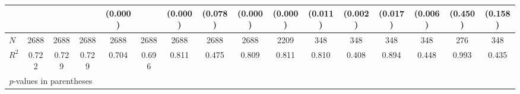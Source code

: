 \begin{tabular}{l*{15}{c}}
            &            &            &            &     (0.000)&            &     (0.000)&     (0.078)&     (0.000)&     (0.000)&     (0.011)&     (0.002)&     (0.017)&     (0.006)&     (0.450)&     (0.158)\\
\hline
\(N\)       &        2688&        2688&        2688&        2688&        2688&        2688&        2688&        2688&        2209&         348&         348&         348&         348&         276&         348\\
\(R^{2}\)   &       0.722&       0.729&       0.729&       0.704&       0.696&       0.811&       0.475&       0.809&       0.811&       0.810&       0.408&       0.894&       0.448&       0.993&       0.435\\
\hline\hline
\multicolumn{16}{l}{\footnotesize \textit{p}-values in parentheses}\\
\end{tabular}
